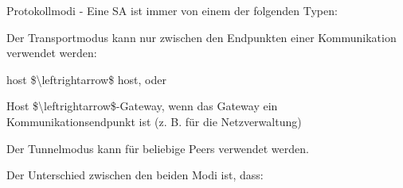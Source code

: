 \documentclass[a4paper]{article}
\begin{document}
\begin{multicols}{3}
\begin{itemize*}
\begin{itemize*}
            \end{itemize*}
            \item Protokollmodi - Eine SA ist immer von einem der folgenden Typen:
            \begin{itemize*}
                  \item Der Transportmodus kann nur zwischen den Endpunkten einer Kommunikation verwendet werden:
                  \begin{itemize*} \item host \$\textbackslash leftrightarrow\$ host, oder \item Host \$\textbackslash leftrightarrow\$-Gateway, wenn das Gateway ein Kommunikationsendpunkt ist (z. B. für die Netzverwaltung) \end{itemize*}
                  \item Der Tunnelmodus kann für beliebige Peers verwendet werden.
            \end{itemize*}
      \end{itemize*}

      Der Unterschied zwischen den beiden Modi ist, dass:


\end{multicols}
\end{document}
